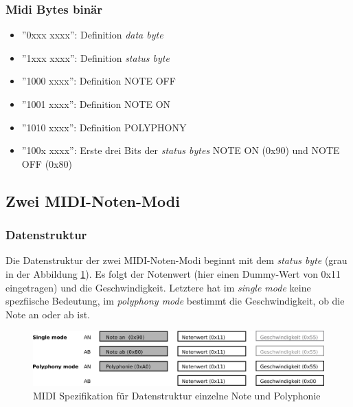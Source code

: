 \subsubsection*{Midi Bytes binär}\label{midi_binaer}
\begin{itemize}
	\item ''0xxx xxxx'': \hspace*{10mm}Definition \textit{data byte}
	\item ''1xxx xxxx'': \hspace*{10mm}Definition \textit{status byte}		
	\item ''1000 xxxx'': \hspace*{10mm}Definition NOTE OFF
	\item ''1001 xxxx'': \hspace*{10mm}Definition NOTE ON
	\item ''1010 xxxx'': \hspace*{10mm}Definition POLYPHONY
	\item ''100x xxxx'': \hspace*{10mm}Erste drei Bits der \textit{status bytes} NOTE ON (0x90) und NOTE OFF (0x80)
\end{itemize}
\newpage
\subsection{Zwei MIDI-Noten-Modi}\label{note_modes}
\subsubsection{Datenstruktur}
Die Datenstruktur der zwei MIDI-Noten-Modi beginnt mit dem \textit{status byte} (grau in der Abbildung \ref{fig.testbench_single_Mode}). Es folgt der Notenwert (hier einen Dummy-Wert von 0x11 eingetragen) und die Geschwindigkeit. Letztere hat im \textit{single mode} keine spezfiische Bedeutung, im \textit{polyphony mode} bestimmt die Geschwindigkeit, ob die Note an oder ab ist.\\


\begin{figure}[H]
	\centering
	\includegraphics[width=1\textwidth]{images/midi_interface/MIDI_Spezifikation.png}
	\caption{MIDI Spezifikation für Datenstruktur einzelne Note und Polyphonie}
	\label{fig.testbench_single_Mode}
\end{figure}

